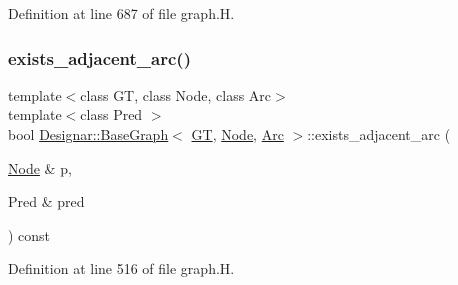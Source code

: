 Definition at line 687 of file graph.\+H.

\mbox{\label{class_designar_1_1_base_graph_a5208fcd131d919271e1d54f6e45ab3e9}} 
\subsubsection{\texorpdfstring{exists\+\_\+adjacent\+\_\+arc()}{exists\_adjacent\_arc()}\hspace{0.1cm}{\footnotesize\ttfamily [1/2]}}
{\footnotesize\ttfamily template$<$class GT, class Node, class Arc$>$ \\
template$<$class Pred $>$ \\
bool \hyperlink{class_designar_1_1_base_graph}{Designar\+::\+Base\+Graph}$<$ \hyperlink{demo-buildgraph_8_c_a3001c40d2c31ca87ed96cd7d1334a55e}{GT}, \hyperlink{namespace_designar_a5af326c65aa2bd26b26c410f2030d09e}{Node}, \hyperlink{namespace_designar_a3f55fb5513d62ff47cbc8f72b8e95d6f}{Arc} $>$\+::exists\+\_\+adjacent\+\_\+arc (\begin{DoxyParamCaption}\item[{\hyperlink{namespace_designar_a5af326c65aa2bd26b26c410f2030d09e}{Node} \&}]{p,  }\item[{Pred \&}]{pred }\end{DoxyParamCaption}) const\hspace{0.3cm}{\ttfamily [inline]}}



Definition at line 516 of file graph.\+H.

\mbox{\label{class_designar_1_1_base_graph_a16d3fbb089265c1dc8da8ffbe2fb1434}} 
